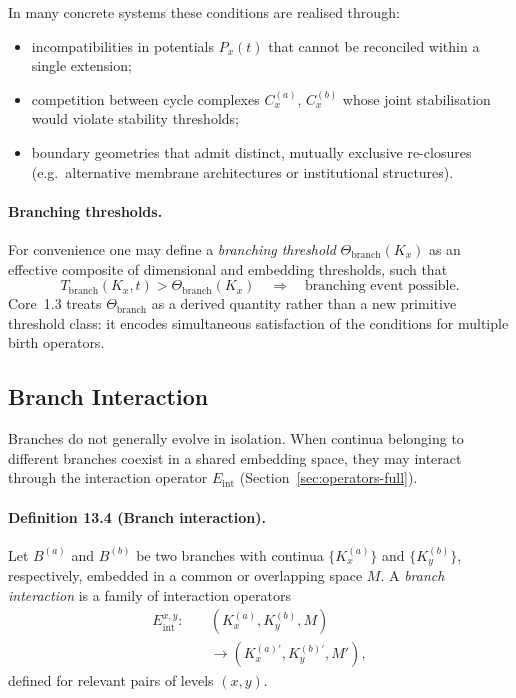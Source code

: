 In many concrete systems these conditions are realised through:
\begin{itemize}
  \item incompatibilities in potentials \(P_x(t)\) that cannot be reconciled
        within a single extension;
  \item competition between cycle complexes \(C_x^{(a)}\), \(C_x^{(b)}\)
        whose joint stabilisation would violate stability thresholds;
  \item boundary geometries that admit distinct, mutually exclusive
        re-closures (e.g.\ alternative membrane architectures or
        institutional structures).
\end{itemize}

\paragraph{Branching thresholds.}
For convenience one may define a \emph{branching threshold}
\(\Theta_{\mathrm{branch}}(K_x)\) as an effective composite of dimensional
and embedding thresholds, such that
\[
  T_{\mathrm{branch}}(K_x,t) > \Theta_{\mathrm{branch}}(K_x)
  \quad\Rightarrow\quad
  \text{branching event possible.}
\]
Core~1.3 treats \(\Theta_{\mathrm{branch}}\) as a derived quantity rather
than a new primitive threshold class: it encodes simultaneous satisfaction of
the conditions for multiple birth operators.

\subsection{Branch Interaction}

Branches do not generally evolve in isolation. When continua belonging to
different branches coexist in a shared embedding space, they may interact
through the interaction operator \(E_{\mathrm{int}}\)
(Section~\ref{sec:operators-full}).

\paragraph{Definition 13.4 (Branch interaction).}
Let \(B^{(a)}\) and \(B^{(b)}\) be two branches with continua
\(\{K_x^{(a)}\}\) and \(\{K_y^{(b)}\}\), respectively, embedded in a common or
overlapping space \(M\). A \emph{branch interaction} is a family of interaction
operators
\[
\begin{aligned}
  E_{\mathrm{int}}^{x,y}:\quad
    &(K_x^{(a)}, K_y^{(b)}, M)\\
    &\longrightarrow (K_x^{(a)\prime}, K_y^{(b)\prime}, M'),
\end{aligned}
\]
defined for relevant pairs of levels \((x,y)\).

